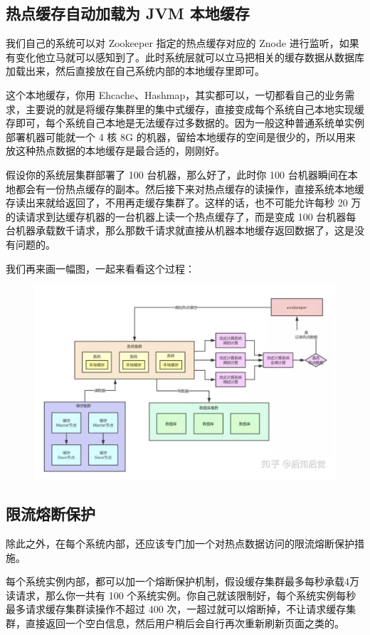 \documentclass[12pt]{article}
\begin{document}
\subsection{热点缓存自动加载为 JVM 本地缓存}
我们自己的系统可以对 Zookeeper 指定的热点缓存对应的 Znode 进行监听，如果有变化他立马就可以感知到了。此时系统层就可以立马把相关的缓存数据从数据库加载出来，然后直接放在自己系统内部的本地缓存里即可。

这个本地缓存，你用 Ehcache、Hashmap，其实都可以，一切都看自己的业务需求，主要说的就是将缓存集群里的集中式缓存，直接变成每个系统自己本地实现缓存即可，每个系统自己本地是无法缓存过多数据的。因为一般这种普通系统单实例部署机器可能就一个 4 核 8G 的机器，留给本地缓存的空间是很少的，所以用来放这种热点数据的本地缓存是最合适的，刚刚好。

假设你的系统层集群部署了 100 台机器，那么好了，此时你 100 台机器瞬间在本地都会有一份热点缓存的副本。然后接下来对热点缓存的读操作，直接系统本地缓存读出来就给返回了，不用再走缓存集群了。这样的话，也不可能允许每秒 20 万的读请求到达缓存机器的一台机器上读一个热点缓存了，而是变成 100 台机器每台机器承载数千请求，那么那数千请求就直接从机器本地缓存返回数据了，这是没有问题的。

我们再来画一幅图，一起来看看这个过程：
\begin{figure}[H]
    \centering
    \includegraphics[width=.8\textwidth]{fig/Cache_Infrastructure_Hot_Key_8.png}
\end{figure}

\subsection{限流熔断保护}
除此之外，在每个系统内部，还应该专门加一个对热点数据访问的限流熔断保护措施。

每个系统实例内部，都可以加一个熔断保护机制，假设缓存集群最多每秒承载4万读请求，那么你一共有 100 个系统实例。你自己就该限制好，每个系统实例每秒最多请求缓存集群读操作不超过 400 次，一超过就可以熔断掉，不让请求缓存集群，直接返回一个空白信息，然后用户稍后会自行再次重新刷新页面之类的。
\end{document}
